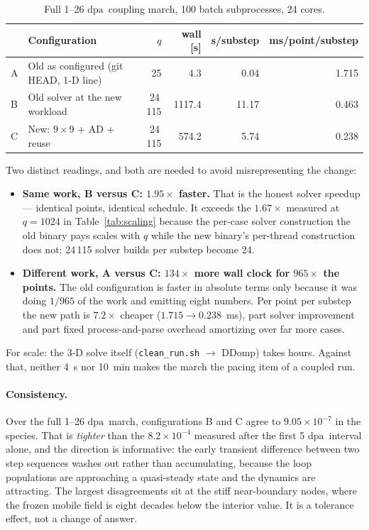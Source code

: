 \documentclass[11pt,a4paper]{article}
\newcommand{\code}[1]{\texttt{\small #1}}
\newcommand{\dpa}{\ensuremath{\mathrm{dpa}}}
\begin{document}
\begin{table}[htb]
\centering
\caption{Full 1--26 \dpa\ coupling march, 100 batch subprocesses, 24 cores.}
\label{tab:march1um}
\begin{tabular}{llrrrr}
\toprule
& Configuration & $q$ & wall [s] & s/substep & ms/point/substep \\
\midrule
A & Old as configured (git HEAD, 1-D line) & 25      & 4.3    & 0.04  & 1.715 \\
B & Old solver at the new workload         & 24\,115 & 1117.4 & 11.17 & 0.463 \\
C & New: $9\times9$ + AD + reuse           & 24\,115 & 574.2  & 5.74  & 0.238 \\
\bottomrule
\end{tabular}
\end{table}

Two distinct readings, and both are needed to avoid misrepresenting the change:

\begin{itemize}
\item \textbf{Same work, B versus C: $1.95\times$ faster.} That is the honest
      solver speedup --- identical points, identical schedule. It exceeds the
      $1.67\times$ measured at $q=1024$ in Table~\ref{tab:scaling} because the
      per-case solver construction the old binary pays scales with $q$ while the
      new binary's per-thread construction does not: 24\,115 solver builds per
      substep become 24.
\item \textbf{Different work, A versus C: $134\times$ more wall clock for
      $965\times$ the points.} The old configuration is faster in absolute terms
      only because it was doing $1/965$ of the work and emitting eight numbers.
      Per point per substep the new path is $7.2\times$ cheaper
      ($1.715\to0.238$~ms), part solver improvement and part fixed
      process-and-parse overhead amortizing over far more cases.
\end{itemize}

For scale: the 3-D solve itself (\code{clean\_run.sh} $\to$ DDomp) takes hours.
Against that, neither 4~s nor 10~min makes the march the pacing item of a
coupled run.

\paragraph{Consistency.} Over the full 1--26 \dpa\ march, configurations B and C
agree to $9.05\times10^{-7}$ in the species. That is \emph{tighter} than the
$8.2\times10^{-4}$ measured after the first 5 \dpa\ interval alone, and the
direction is informative: the early transient difference between two step
sequences washes out rather than accumulating, because the loop populations are
approaching a quasi-steady state and the dynamics are attracting. The largest
disagreements sit at the stiff near-boundary nodes, where the frozen mobile field
is eight decades below the interior value. It is a tolerance effect, not a change
of answer.
\end{document}
